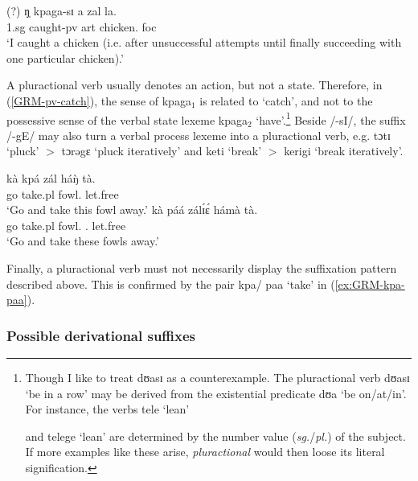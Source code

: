 \begin{exe}
\begin{exe}
\begin{exe}
{\begin{exe}
\begin{exe}
\begin{exe}
\begin{exe}
\begin{exe}
\begin{exe}
\begin{exe}
\begin{exe}
\begin{exe}
\begin{exe}
\begin{exe}
\begin{exe}
\begin{exe}
\begin{exe}
\begin{exe}
\begin{exe}
\begin{exe}
\begin{exe}
\begin{exe}
\begin{exe}
\begin{exe}
 \ex\label{GRM-pv-catchout}
\gll (?)  ŋ̩  kpaga-sɪ  a  zal  la.\\
  {}   {\sc 1.sg}  {caught-{\sc pv}} {\sc art} {chicken.\sg} {\sc foc}\\
\glt `I caught a chicken (i.e. after unsuccessful attempts until finally
succeeding with
one particular chicken).'

 
\z 
 \z


A pluractional verb usually denotes an action, but not a state. Therefore, in
(\ref{GRM-pv-catch}), the sense of {\sls kpaga}$_{1}$  is related to `catch', 
and 
not
to the  possessive sense of the verbal state lexeme   {\sls kpaga}$_{2}$
`have'.\footnote{Though I like to treat {\sls dʊasɪ} as a counterexample.  The
pluractional verb {\sls dʊasɪ} `be in a row'  may be  derived from the 
existential
predicate {\sls dʊa} `be on/at/in'.  For instance, the verbs {\sls tele} `lean' 
  
and {\sls telege} `lean' are determined 
by
the number value ({\it sg.}/{\it  pl.})  of the subject.  If more examples like
these  arise, {\it pluractional} would then loose its literal 
signification.} Beside {\sls /-sI/}, the suffix {\sls 
/-gE/} may also turn a verbal process lexeme into a pluractional verb, e.g.   
{\sls tɔtɪ} `pluck' $>$ {\sls  tɔrəgɛ} `pluck iteratively' and  {\sls keti} 
`break'  $>$
{\sls kerigi} `break iteratively'.

\ea\label{ex:GRM-kpa-paa}
  
 \ea\label{ex:GRM-kpa}
\gll kà kpá zál háŋ̀ tà.\\
go take.{\sc pl} fowl.{\sg} {\dem} let.free\\
\glt `Go and take this fowl away.'
   \ex\label{ex:GRM-paa}
\gll kà páá zálɪ́ɛ́ hámà tà.\\
go take.{\sc pl} fowl.{\pl} {\dem}.{\pl}  let.free\\
\glt `Go and take these fowls away.'
 
\z 
 \z


Finally, a pluractional verb must not necessarily display the
suffixation pattern
described above. This is confirmed by the pair  {\sls kpa}/{\sls 
paa} `take'  in
(\ref{ex:GRM-kpa-paa}).




\subsubsection{Possible derivational suffixes}
\label{sec:GRM-deri-suff}



\end{exe}
\end{exe}
\end{exe}
\end{exe}
\end{exe}
\end{exe}
\end{exe}
\end{exe}
\end{exe}
\end{exe}
\end{exe}
\end{exe}
\end{exe}
\end{exe}
\end{exe}
\end{exe}
\end{exe}
\end{exe}
\end{exe}
\end{exe}
\end{exe}}
\end{exe}
\end{exe}
\end{exe}
